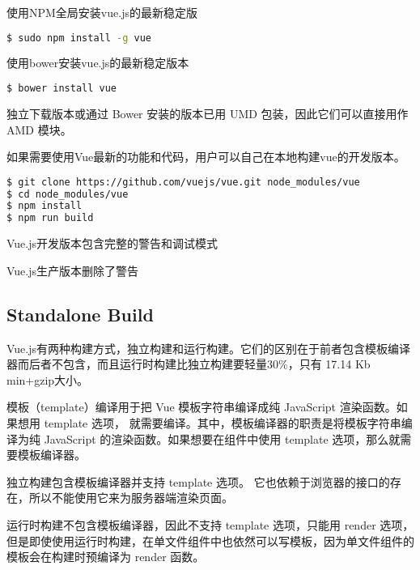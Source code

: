 \begin{compactitem}
\item 使用NPM全局安装vue.js的最新稳定版

\begin{lstlisting}[language=bash]
$ sudo npm install -g vue
\end{lstlisting}

\item 使用bower安装vue.js的最新稳定版本

\begin{lstlisting}[language=bash]
$ bower install vue
\end{lstlisting}
\end{compactitem}

独立下载版本或通过 Bower 安装的版本已用 UMD 包装，因此它们可以直接用作 AMD 模块。



如果需要使用Vue最新的功能和代码，用户可以自己在本地构建vue的开发版本。


\begin{lstlisting}[language=bash]
$ git clone https://github.com/vuejs/vue.git node_modules/vue
$ cd node_modules/vue
$ npm install
$ npm run build
\end{lstlisting}

\begin{compactitem}
\item Vue.js开发版本包含完整的警告和调试模式
\item Vue.js生产版本删除了警告
\end{compactitem}


\subsection{Standalone Build}


Vue.js有两种构建方式，独立构建和运行构建。它们的区别在于前者包含模板编译器而后者不包含，而且运行时构建比独立构建要轻量30\%，只有 17.14 Kb min+gzip大小。


模板（template）编译用于把 Vue 模板字符串编译成纯 JavaScript 渲染函数。如果想用 template 选项， 就需要编译。其中，模板编译器的职责是将模板字符串编译为纯 JavaScript 的渲染函数。如果想要在组件中使用 template 选项，那么就需要模板编译器。


\begin{compactitem}
\item 独立构建包含模板编译器并支持 template 选项。 它也依赖于浏览器的接口的存在，所以不能使用它来为服务器端渲染页面。
\item 运行时构建不包含模板编译器，因此不支持 template 选项，只能用 render 选项，但是即使使用运行时构建，在单文件组件中也依然可以写模板，因为单文件组件的模板会在构建时预编译为 render 函数。
\end{compactitem}






